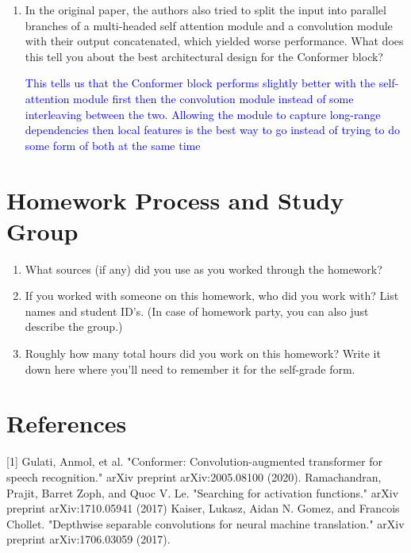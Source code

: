 \documentclass{article}
\begin{document}
\begin{enumerate}[label=(\alph*)]
\begin{enumerate}[label=(\roman*)]
    \item In the original paper, the authors also tried to split the input into parallel branches of a multi-headed self attention module and a convolution module with their output concatenated, which yielded worse performance. What does this tell you about the best architectural design for the Conformer block?

    \textcolor{blue}{This tells us that the Conformer block performs slightly better with the self-attention module first then the convolution module instead of some interleaving between the two. Allowing the module to capture long-range dependencies then local features is the best way to go instead of trying to do some form of both at the same time}
    
\end{enumerate}
\end{enumerate}
\thispagestyle{plain}


\newpage
\thispagestyle{plain}
\section{Homework Process and Study Group}
\begin{enumerate}[label=(\alph*)]
    \item What sources (if any) did you use as you worked through the homework?
    \item If you worked with someone on this homework, who did you work with?
        List names and student ID’s. (In case of homework party, you can also just describe the group.)
    \item Roughly how many total hours did you work on this homework? Write it down here where you’ll need to remember it for the self-grade form.

\end{enumerate}
\newpage
\thispagestyle{plain}
\section{References}
[1] Gulati, Anmol, et al. "Conformer: Convolution-augmented transformer for speech recognition." arXiv preprint arXiv:2005.08100 (2020). 
\newline\newline
[2] Ramachandran, Prajit, Barret Zoph, and Quoc V. Le. "Searching for activation functions." arXiv preprint arXiv:1710.05941 (2017)
\newline\newline
[3] Kaiser, Lukasz, Aidan N. Gomez, and Francois Chollet. "Depthwise separable convolutions for neural machine translation." arXiv preprint arXiv:1706.03059 (2017).
\end{document}
